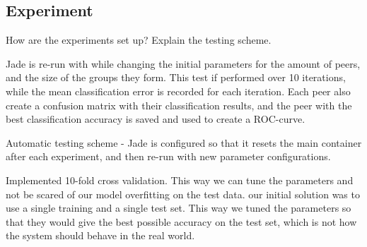 \subsection{Experiment}
How are the experiments set up?
Explain the testing scheme.

Jade is re-run with while changing the initial parameters for the amount of peers, and the size of the groups they form. This test if performed over 10 iterations, while the mean classification error is recorded for each iteration. Each peer also create a confusion matrix with their classification results, and the peer with the best classification accuracy is saved and used to create a ROC-curve. 

Automatic testing scheme - Jade is configured so that it resets the main container after each experiment, and then re-run with new parameter configurations. 

Implemented 10-fold cross validation. This way we can tune the parameters and not be scared of our model overfitting on the test data. our initial solution was to use a single training and a single test set. This way we tuned the parameters so that they would give the best possible accuracy on the test set, which is not how the system should behave in the real world. 



\cleardoublepage
